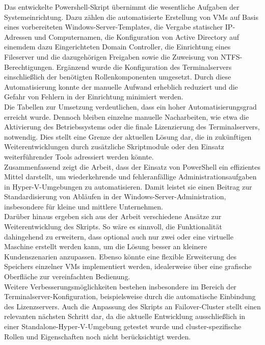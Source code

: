 \documentclass[a4paper,12pt]{article}
\begin{document}
Das entwickelte Powershell-Skript übernimmt die wesentliche Aufgaben der Systemeinrichtung. 
Dazu zählen die automatisierte Erstellung von VMs auf Basis eines vorbereiteten Windows-Server-Templates, die Vergabe statischer IP-Adressen und Computernamen, die Konfiguration von Active Directory auf einemdem dazu Eingerichteten Domain Controller, die Einrichtung eines Fileserver und die dazugehörigen Freigaben sowie die Zuweisung von NTFS-Berechtigungen. 
Ergänzend wurde die Konfiguration des Terminalservers einschließlich der benötigten Rollenkomponenten umgesetzt. 
Durch diese Automatisierung konnte der manuelle Aufwand erheblich reduziert und die Gefahr von Fehlern in der Einrichtung minimiert werden.\\

Die Tabellen zur Umsetzung verdeutlichen, dass ein hoher Automatisierungsgrad erreicht wurde.
Dennoch bleiben einzelne manuelle Nacharbeiten, wie etwa die Aktivierung des Betriebssystems oder die finale Lizenzierung des Terminalservers, notwendig.
Dies stellt eine Grenze der aktuellen Lösung dar, die in zukünftigen Weiterentwicklungen durch zusätzliche Skriptmodule oder den Einsatz weiterführender Tools adressiert werden könnte.\\

Zusammenfassend zeigt die Arbeit, dass der Einsatz von PowerShell ein effizientes Mittel darstellt, um wiederkehrende und fehleranfällige Administrationsaufgaben in Hyper-V-Umgebungen zu automatisieren. 
Damit leistet sie einen Beitrag zur Standardisierung von Abläufen in der Windows-Server-Administration, insbesondere für kleine und mittlere Unternehmen.\\

Darüber hinaus ergeben sich aus der Arbeit verschiedene Ansätze zur Weiterentwicklung des Skripts. 
So wäre es sinnvoll, die Funktionalität dahingehend zu erweitern, dass optional auch nur zwei oder eine virtuelle Maschine erstellt werden kann, um die Lösung besser an kleinere Kundenszenarien anzupassen. 
Ebenso könnte eine flexible Erweiterung des Speichers einzelner VMs implementiert werden, idealerweise über eine grafische Oberfläche zur vereinfachten Bedienung.\\

Weitere Verbesserungsmöglichkeiten bestehen insbesondere im Bereich der Terminalserver-Konfiguration, beispielsweise durch die automatische Einbindung des Lizenzservers. 
Auch die Anpassung des Skripts an Failover-Cluster stellt einen relevanten nächsten Schritt dar, da die aktuelle Entwicklung ausschließlich in einer Standalone-Hyper-V-Umgebung getestet wurde und cluster-spezifische Rollen und Eigenschaften noch nicht berücksichtigt werden.\\
\end{document}
